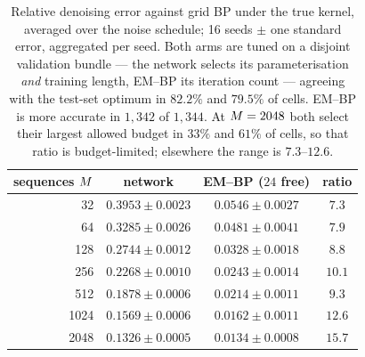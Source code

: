 
\begin{table}[!htbp]
\caption{Relative denoising error against grid BP under the true kernel, averaged over the noise
schedule; 16 seeds $\pm$ one standard error, aggregated per seed. Both arms are tuned on a
disjoint validation bundle --- the network selects its parameterisation \emph{and} training
length, EM--BP its iteration count --- agreeing with the test-set optimum in $82.2\%$ and
$79.5\%$ of cells. EM--BP is more accurate in $1{,}342$ of $1{,}344$.
At $M = 2048$ both select their largest allowed budget in $33\%$ and
$61\%$ of cells, so that ratio is budget-limited; elsewhere the range is
$7.3$--$12.6$.}
\label{tab:pointwise}
\centering
\begin{tabular}{rccc}
\toprule
sequences $M$ & network & EM--BP ($24$ free) & ratio \\
\midrule
32   & $0.3953 \pm 0.0023$ & $\mathbf{0.0546 \pm 0.0027}$ & $7.3$ \\
64   & $0.3285 \pm 0.0026$ & $\mathbf{0.0481 \pm 0.0041}$ & $7.9$ \\
128  & $0.2744 \pm 0.0012$ & $\mathbf{0.0328 \pm 0.0018}$ & $8.8$ \\
256  & $0.2268 \pm 0.0010$ & $\mathbf{0.0243 \pm 0.0014}$ & $10.1$ \\
512  & $0.1878 \pm 0.0006$ & $\mathbf{0.0214 \pm 0.0011}$ & $9.3$ \\
1024 & $0.1569 \pm 0.0006$ & $\mathbf{0.0162 \pm 0.0011}$ & $12.6$ \\
2048 & $0.1326 \pm 0.0005$ & $\mathbf{0.0134 \pm 0.0008}$ & $15.7$ \\
\bottomrule
\end{tabular}
\end{table}
